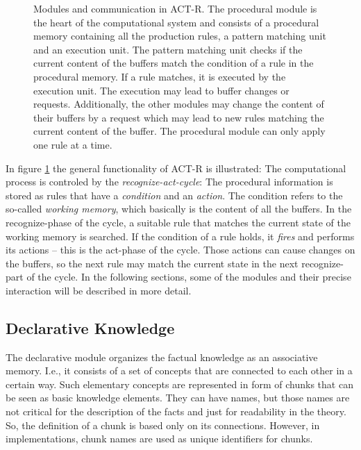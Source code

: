 \begin{figure}[hbt]
\caption{Modules and communication in ACT-R. The procedural module is the heart of the computational system and consists of a procedural memory containing all the production rules, a pattern matching unit and an execution unit. The pattern matching unit checks if the current content of the buffers match the condition of a rule in the procedural memory. If a rule matches, it is executed by the execution unit. The execution may lead to buffer changes or requests. Additionally, the other modules may change the content of their buffers by a request which may lead to new rules matching the current content of the buffer. The procedural module can only apply one rule at a time. \cite{about_actr_homepage}}
\label{fig:recognize_act}
\end{figure}

In figure \ref{fig:recognize_act} the general functionality of ACT-R is illustrated: The computational process is controled by the \emph{recognize-act-cycle}: The procedural information is stored as rules that have a \emph{condition} and an \emph{action}. The condition refers to the so-called \emph{working memory}, which basically is the content of all the buffers. In the recognize-phase of the cycle, a suitable rule that matches the current state of the working memory is searched. If the condition of a rule holds, it \emph{fires} and performs its actions -- this is the act-phase of the cycle. Those actions can cause changes on the buffers, so the next rule may match the current state in the next recognize-part of the cycle. In the following sections, some of the modules and their precise interaction will be described in more detail.

\subsection{Declarative Knowledge}

The declarative module organizes the factual knowledge as an associative memory. I.e., it consists of a set of concepts that are connected to each other in a certain way. Such elementary concepts are represented in form of chunks that can be seen as basic knowledge elements. They can have names, but those names are not critical for the description of the facts and just for readability in the theory. So, the definition of a chunk is based only on its connections. However, in implementations, chunk names are used as unique identifiers for chunks.

